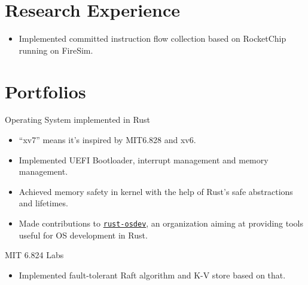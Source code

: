 \documentclass{resume}
\newcommand{\en}[1]{#1}
\newcommand{\zh}[1]{}
\begin{document}
\section{\en{Research Experience}\zh{研究经历}}
\en{}
\zh{\datedsubsection{\textbf{清华大学网络大数据技术研究中心}}{2020/02 -- 至今}}
\en{}
\zh{\role{RISC-V 可信执行环境}{科研实习}}
\begin{itemize}
      \item \en{Implemented committed instruction flow collection based on RocketChip running on FireSim.}
            \zh{实现了 FireSim 上基于 RocketChip 的指令流收集}
\end{itemize}

\section{\en{Portfolios}\zh{个人项目}}
\en{Operating System implemented in Rust}
\zh{使用 Rust 编写的操作系统}
\begin{itemize}
      \item \en{``xv7'' means it's inspired by MIT6.828 and xv6.}
            \zh{项目目标为使用 Rust 重新实现 MIT6.828 和 xv6}
      \item \en{Implemented UEFI Bootloader, interrupt management and memory management.}
            \zh{实现了 UEFI Bootloader 、中断处理与内存管理}
      \item \en{Achieved memory safety in kernel with the help of Rust's safe abstractions and lifetimes.}
            \zh{借助 Rust 的抽象能力与生命周期概念实现内核中的内存安全}
      \item \en{Made contributions to \texttt{\href{https://github.com/rust-osdev}{rust-osdev}}, an organization aiming at providing tools useful for OS development in Rust.}
            \zh{为 Rust 操作系统开源组织 \texttt{\href{https://github.com/rust-osdev}{rust-osdev}} 贡献代码}
\end{itemize}

\en{}
\zh{\datedsubsection{\textbf{分布式系统一致性算法 Raft}}{2019/08}}
MIT 6.824 Labs
\begin{itemize}
      \item \en{Implemented fault-tolerant Raft algorithm and K-V store based on that.}
            \zh{理解了 Raft 算法的原理，实现了容错的 Raft 算法，并在其基础上实现了 K-V 存取}
\end{itemize}
\end{document}
